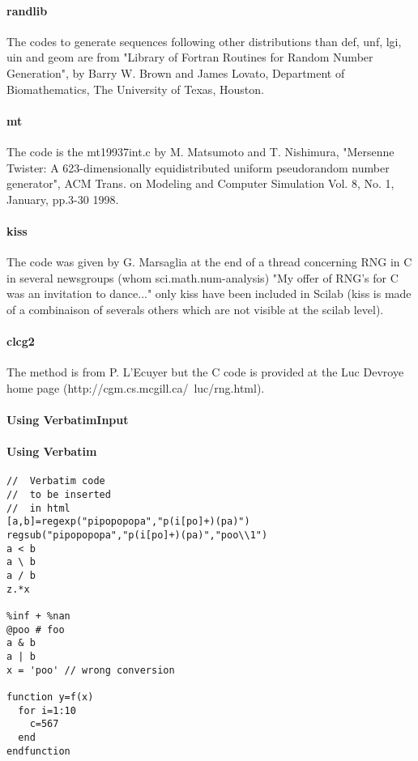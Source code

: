 \begin{authors}
  \paragraph{randlib} 
  The codes to generate sequences following other distributions than def, unf, lgi,  uin and geom are
  from "Library of Fortran Routines for Random Number  Generation", by Barry W. Brown 
  and James Lovato, Department of Biomathematics, The University of Texas, Houston.  
  \paragraph{mt} 
  The code is the mt19937int.c by M. Matsumoto and  T. Nishimura, "Mersenne Twister: 
  A 623-dimensionally equidistributed  uniform pseudorandom number generator", 
  ACM Trans. on Modeling and  Computer Simulation Vol. 8, No. 1, January, pp.3-30 1998.
  \paragraph{kiss} 
  The code was given by G. Marsaglia at the end of a thread concerning RNG in C in several 
  newsgroups (whom sci.math.num-analysis) "My offer of  RNG's for C was an invitation 
  to dance..." only kiss have been included in Scilab (kiss is made of a combinaison of 
  severals others which are not visible at the scilab level).
  \paragraph{clcg2} 
  The method is from P. L'Ecuyer but the C code is provided at the Luc  Devroye home page 
  (http://cgm.cs.mcgill.ca/~luc/rng.html).
\end{authors}


\paragraph{Using VerbatimInput}


\paragraph{Using Verbatim}

\begin{Verbatim}
//	Verbatim code 
//	to be inserted 
//	in html
[a,b]=regexp("pipopopopa","p(i[po]+)(pa)")
regsub("pipopopopa","p(i[po]+)(pa)","poo\\1")
a < b 
a \ b  
a / b 
z.*x

%inf + %nan 
@poo # foo 
a & b 
a | b 
x = 'poo' // wrong conversion

function y=f(x)
  for i=1:10
    c=567
  end
endfunction
\end{Verbatim}

